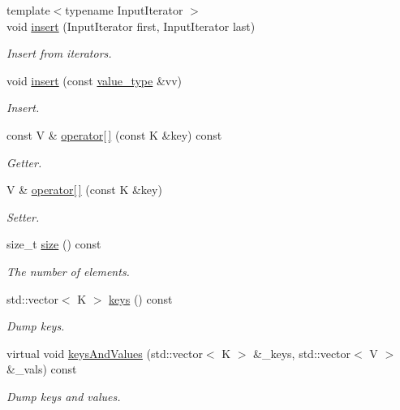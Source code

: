\begin{DoxyCompactItemize}
{\footnotesize template$<$typename Input\+Iterator $>$ }\\void \mbox{\hyperlink{classADAT_1_1MapObject_a151aa826b6db5cd124ed13f4a293da2b}{insert}} (Input\+Iterator first, Input\+Iterator last)
\begin{DoxyCompactList}\small\item\em Insert from iterators. \end{DoxyCompactList}\item 
void \mbox{\hyperlink{classADAT_1_1MapObject_aaa819ee6219acf8f74c39563c9c68ab4}{insert}} (const \mbox{\hyperlink{classADAT_1_1MapObject_ad985e6ff5b35a72c79d4b466d316cc0a}{value\+\_\+type}} \&vv)
\begin{DoxyCompactList}\small\item\em Insert. \end{DoxyCompactList}\item 
const V \& \mbox{\hyperlink{classADAT_1_1MapObject_adb014dc7d3ef80a73fd1734e818eeef4}{operator\mbox{[}$\,$\mbox{]}}} (const K \&key) const
\begin{DoxyCompactList}\small\item\em Getter. \end{DoxyCompactList}\item 
V \& \mbox{\hyperlink{classADAT_1_1MapObject_ab6ac0d8eccffc7975fd329649dd6f9e7}{operator\mbox{[}$\,$\mbox{]}}} (const K \&key)
\begin{DoxyCompactList}\small\item\em Setter. \end{DoxyCompactList}\item 
size\+\_\+t \mbox{\hyperlink{classADAT_1_1MapObject_ac0f5c3b258d234a7baf4f3d75e304af7}{size}} () const
\begin{DoxyCompactList}\small\item\em The number of elements. \end{DoxyCompactList}\item 
std\+::vector$<$ K $>$ \mbox{\hyperlink{classADAT_1_1MapObject_af767d0e9da82e3a249d3340d57da66e1}{keys}} () const
\begin{DoxyCompactList}\small\item\em Dump keys. \end{DoxyCompactList}\item 
virtual void \mbox{\hyperlink{classADAT_1_1MapObject_ab19c1622f3edfd0755e42583e6a48844}{keys\+And\+Values}} (std\+::vector$<$ K $>$ \&\+\_\+keys, std\+::vector$<$ V $>$ \&\+\_\+vals) const
\begin{DoxyCompactList}\small\item\em Dump keys and values. \end{DoxyCompactList}\item 

\end{DoxyCompactItemize}
